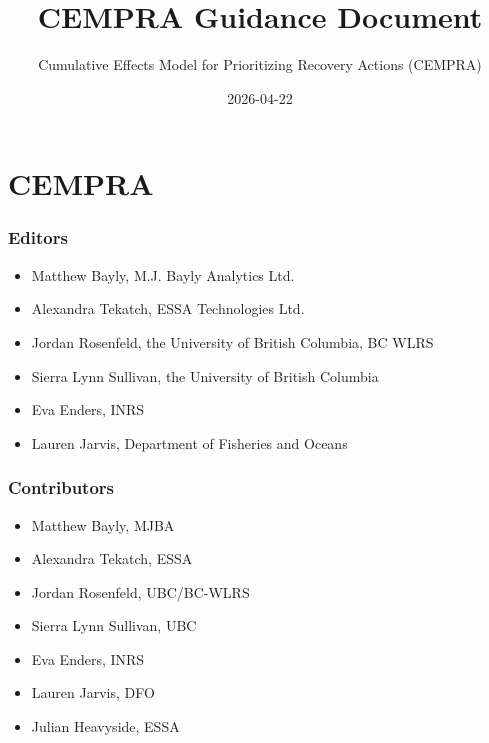 \documentclass[
  letterpaper,
  DIV=11,
  numbers=noendperiod]{scrreprt}
\title{CEMPRA Guidance Document}
\subtitle{Cumulative Effects Model for Prioritizing Recovery Actions
(CEMPRA)}
\author{}
\date{2026-04-22}
\providecommand{\tightlist}{%
  \setlength{\itemsep}{0pt}\setlength{\parskip}{0pt}}
\renewcommand*\contentsname{Table of contents}
\newcommand\contentsname{Table of contents}
\begin{document}
\maketitle

\renewcommand*\contentsname{Table of contents}
{
\hypersetup{linkcolor=}
\setcounter{tocdepth}{2}
\tableofcontents
}


\chapter*{CEMPRA}\label{cempra}


\subsection*{Editors}\label{editors}

\begin{itemize}
\tightlist
\item
  Matthew Bayly, M.J. Bayly Analytics Ltd.
\item
  Alexandra Tekatch, ESSA Technologies Ltd.
\item
  Jordan Rosenfeld, the University of British Columbia, BC WLRS
\item
  Sierra Lynn Sullivan, the University of British Columbia
\item
  Eva Enders, INRS
\item
  Lauren Jarvis, Department of Fisheries and Oceans
\end{itemize}

\subsection*{Contributors}\label{contributors}

\begin{itemize}
\tightlist
\item
  Matthew Bayly, MJBA
\item
  Alexandra Tekatch, ESSA
\item
  Jordan Rosenfeld, UBC/BC-WLRS
\item
  Sierra Lynn Sullivan, UBC
\item
  Eva Enders, INRS
\item
  Lauren Jarvis, DFO
\item
  Julian Heavyside, ESSA
\end{itemize}
\end{document}
